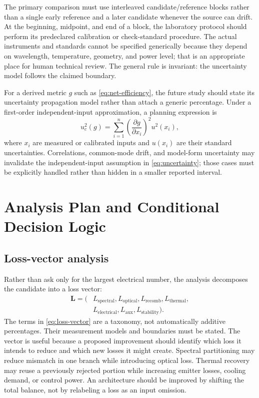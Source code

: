 \documentclass[conference]{../../../../Conference-LaTeX-template_10-17-19/IEEEtran}
\begin{document}
The primary comparison must use interleaved candidate/reference blocks rather than a single early reference and a later candidate whenever the source can drift. At the beginning, midpoint, and end of a block, the laboratory protocol should perform its predeclared calibration or check-standard procedure. The actual instruments and standards cannot be specified generically because they depend on wavelength, temperature, geometry, and power level; that is an appropriate place for human technical review. The general rule is invariant: the uncertainty model follows the claimed boundary.

For a derived metric $g$ such as \eqref{eq:net-efficiency}, the future study should state its uncertainty propagation model rather than attach a generic percentage. Under a first-order independent-input approximation, a planning expression is
\begin{equation}
u_c^2(g)=\sum_{i=1}^{n}\left(\frac{\partial g}{\partial x_i}\right)^2u^2(x_i),
\label{eq:uncertainty}
\end{equation}
where $x_i$ are measured or calibrated inputs and $u(x_i)$ are their standard uncertainties. Correlations, common-mode drift, and model-form uncertainty may invalidate the independent-input assumption in \eqref{eq:uncertainty}; those cases must be explicitly handled rather than hidden in a smaller reported interval.

\section{Analysis Plan and Conditional Decision Logic}
\subsection{Loss-vector analysis}
Rather than ask only for the largest electrical number, the analysis decomposes the candidate into a loss vector:
\begin{align}
\mathbf{L}=\big(&L_{\mathrm{spectral}},L_{\mathrm{optical}},L_{\mathrm{recomb}},L_{\mathrm{thermal}},\nonumber\\
&L_{\mathrm{electrical}},L_{\mathrm{aux}},L_{\mathrm{stability}}\big).
\label{eq:loss-vector}
\end{align}
The terms in \eqref{eq:loss-vector} are a taxonomy, not automatically additive percentages. Their measurement models and boundaries must be stated. The vector is useful because a proposed improvement should identify which loss it intends to reduce and which new losses it might create. Spectral partitioning may reduce mismatch in one branch while introducing optical loss. Thermal recovery may reuse a previously rejected portion while increasing emitter losses, cooling demand, or control power. An architecture should be improved by shifting the total balance, not by relabeling a loss as an input omission.
\end{document}
